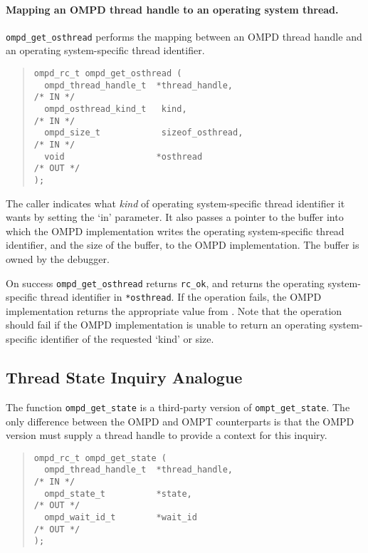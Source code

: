 \paragraph{Mapping an OMPD thread handle to an operating system thread.}
\verb|ompd_get_osthread| performs the mapping between an OMPD
thread handle and an operating system-specific thread identifier.
\begin{quote}
\begin{lstlisting}
ompd_rc_t ompd_get_osthread (
  ompd_thread_handle_t  *thread_handle,                             /* IN */
  ompd_osthread_kind_t   kind,                                      /* IN */
  ompd_size_t            sizeof_osthread,                           /* IN */
  void                  *osthread                                  /* OUT */
);
\end{lstlisting}
\end{quote}

The caller indicates what \emph{kind} of operating system-specific thread
identifier it wants by setting the 
`in' parameter.
It also passes a pointer to the buffer into which the OMPD
implementation writes the operating system-specific thread identifier,
and the size of the buffer, to the OMPD implementation.
The buffer is owned by the debugger.

On success \texttt{ompd\_get\_osthread} returns \texttt{rc\_ok},
and returns the operating system-specific thread identifier in
\texttt{*osthread}.
If the operation fails, the OMPD implementation returns
the appropriate value from .
Note that the operation should fail if the OMPD implementation is
unable to return an operating system-specific identifier of the
requested `kind' or size.


\subsection{Thread State Inquiry Analogue}

The function \verb|ompd_get_state| is a  third-party version of
\verb|ompt_get_state|. 
The only difference between the OMPD and OMPT counterparts
is that the OMPD version must supply a thread handle to provide
a context for this inquiry.

\begin{quote}
\begin{lstlisting}
ompd_rc_t ompd_get_state (
  ompd_thread_handle_t  *thread_handle,                             /* IN */
  ompd_state_t          *state,                                    /* OUT */
  ompd_wait_id_t        *wait_id                                   /* OUT */
);
\end{lstlisting}
\end{quote}
